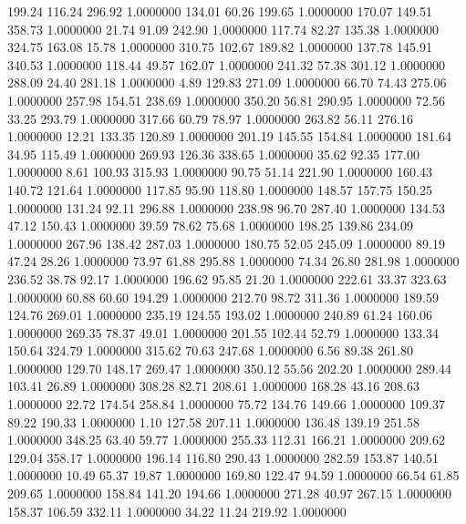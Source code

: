  199.24  116.24  296.92   1.0000000
 134.01   60.26  199.65   1.0000000
 170.07  149.51  358.73   1.0000000
  21.74   91.09  242.90   1.0000000
 117.74   82.27  135.38   1.0000000
 324.75  163.08   15.78   1.0000000
 310.75  102.67  189.82   1.0000000
 137.78  145.91  340.53   1.0000000
 118.44   49.57  162.07   1.0000000
 241.32   57.38  301.12   1.0000000
 288.09   24.40  281.18   1.0000000
   4.89  129.83  271.09   1.0000000
  66.70   74.43  275.06   1.0000000
 257.98  154.51  238.69   1.0000000
 350.20   56.81  290.95   1.0000000
  72.56   33.25  293.79   1.0000000
 317.66   60.79   78.97   1.0000000
 263.82   56.11  276.16   1.0000000
  12.21  133.35  120.89   1.0000000
 201.19  145.55  154.84   1.0000000
 181.64   34.95  115.49   1.0000000
 269.93  126.36  338.65   1.0000000
  35.62   92.35  177.00   1.0000000
   8.61  100.93  315.93   1.0000000
  90.75   51.14  221.90   1.0000000
 160.43  140.72  121.64   1.0000000
 117.85   95.90  118.80   1.0000000
 148.57  157.75  150.25   1.0000000
 131.24   92.11  296.88   1.0000000
 238.98   96.70  287.40   1.0000000
 134.53   47.12  150.43   1.0000000
  39.59   78.62   75.68   1.0000000
 198.25  139.86  234.09   1.0000000
 267.96  138.42  287.03   1.0000000
 180.75   52.05  245.09   1.0000000
  89.19   47.24   28.26   1.0000000
  73.97   61.88  295.88   1.0000000
  74.34   26.80  281.98   1.0000000
 236.52   38.78   92.17   1.0000000
 196.62   95.85   21.20   1.0000000
 222.61   33.37  323.63   1.0000000
  60.88   60.60  194.29   1.0000000
 212.70   98.72  311.36   1.0000000
 189.59  124.76  269.01   1.0000000
 235.19  124.55  193.02   1.0000000
 240.89   61.24  160.06   1.0000000
 269.35   78.37   49.01   1.0000000
 201.55  102.44   52.79   1.0000000
 133.34  150.64  324.79   1.0000000
 315.62   70.63  247.68   1.0000000
   6.56   89.38  261.80   1.0000000
 129.70  148.17  269.47   1.0000000
 350.12   55.56  202.20   1.0000000
 289.44  103.41   26.89   1.0000000
 308.28   82.71  208.61   1.0000000
 168.28   43.16  208.63   1.0000000
  22.72  174.54  258.84   1.0000000
  75.72  134.76  149.66   1.0000000
 109.37   89.22  190.33   1.0000000
   1.10  127.58  207.11   1.0000000
 136.48  139.19  251.58   1.0000000
 348.25   63.40   59.77   1.0000000
 255.33  112.31  166.21   1.0000000
 209.62  129.04  358.17   1.0000000
 196.14  116.80  290.43   1.0000000
 282.59  153.87  140.51   1.0000000
  10.49   65.37   19.87   1.0000000
 169.80  122.47   94.59   1.0000000
  66.54   61.85  209.65   1.0000000
 158.84  141.20  194.66   1.0000000
 271.28   40.97  267.15   1.0000000
 158.37  106.59  332.11   1.0000000
  34.22   11.24  219.92   1.0000000
